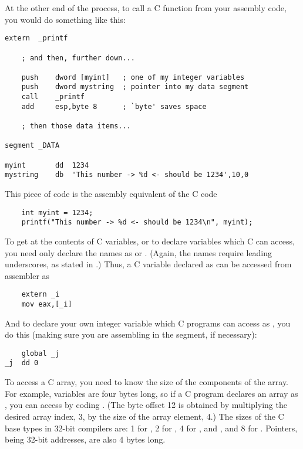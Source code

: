 At the other end of the process, to call a C function from your
assembly code, you would do something like this:

\begin{lstlisting}
extern  _printf

    ; and then, further down...

    push    dword [myint]   ; one of my integer variables
    push    dword mystring  ; pointer into my data segment
    call    _printf
    add     esp,byte 8      ; `byte' saves space

    ; then those data items...

segment _DATA

myint       dd  1234
mystring    db  'This number -> %d <- should be 1234',10,0
\end{lstlisting}

This piece of code is the assembly equivalent of the C code

\begin{lstlisting}
    int myint = 1234;
    printf("This number -> %d <- should be 1234\n", myint);
\end{lstlisting}


To get at the contents of C variables, or to declare variables which
C can access, you need only declare the names as  or
. (Again, the names require leading underscores, as stated
in .) Thus, a C variable declared as 
can be accessed from assembler as

\begin{lstlisting}
    extern _i
    mov eax,[_i]
\end{lstlisting}

And to declare your own integer variable which C programs can access
as , you do this (making sure you are assembling in
the  segment, if necessary):

\begin{lstlisting}
    global _j
_j  dd 0
\end{lstlisting}

To access a C array, you need to know the size of the components of
the array. For example,  variables are four bytes long, so if
a C program declares an array as , you can access
 by coding . (The byte offset 12 is
obtained by multiplying the desired array index, 3, by the size of
the array element, 4.) The sizes of the C base types in 32-bit compilers
are: 1 for , 2 for , 4 for , 
and , and 8 for . Pointers, being 32-bit
addresses, are also 4 bytes long.

